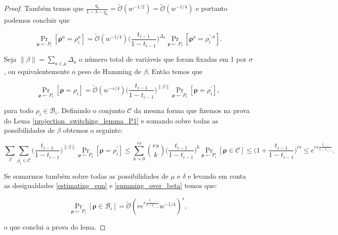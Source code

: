 \begin{proof}
	Também temos que $\frac{q_{a}}{1 - \lambda - q_{a}} = \widetilde{\mathcal{O}}(w^{-1/2}) = \widetilde{\mathcal{O}}(w^{-1/4})$ e portanto podemos concluir que
	
	\begin{equation*}
		\Pr_{\boldsymbol{\rho} \leftarrow P_{i}}[\boldsymbol{\rho}^{a} = \rho_{i}^{a}] = \widetilde{\mathcal{O}}(w^{-1/4}) \bigg( \frac{t_{i - 1}}{1 - t_{i - 1}} \bigg)^{\Delta_{a}}\Pr_{\boldsymbol{\rho} \leftarrow P_{i}}[\boldsymbol{\rho}^{a} = \rho_{i}^{\prime, a}].
	\end{equation*}
	
	Seja $\lVert \beta \rVert = \sum_{a \in \mu} \Delta_{a}$ o número total de variáveis que foram fixadas em 1 por $\sigma$, ou equivalentemente o peso de Hamming de $\beta$. Então temos que
	
	\begin{equation} \label{estimating_eqn}
		\Pr_{\boldsymbol{\rho} \leftarrow P_{i}}[\boldsymbol{\rho} = \rho_{i}] = \widetilde{\mathcal{O}}(w^{-s/4}) \bigg( \frac{t_{i - 1}}{1 - t_{i - 1}} \bigg)^{\lVert \beta \rVert}\Pr_{\boldsymbol{\rho} \leftarrow P_{i}}[\boldsymbol{\rho} = \rho_{i}^{\prime}],
	\end{equation}
	
	para todo $\rho_{i} \in \mathcal{B}_{i}$. Definindo o conjunto $\mathcal{C}$ da mesma forma que fizemos na prova do Lema \ref{projection_switching_lemma_P1} e somando sobre todas as possibilidades de $\beta$ obtemos o seguinte: 
	
	\begin{equation} \label{summing_over_beta}
		\sum_{\beta}\sum_{\rho_{i}^{\prime} \in \mathcal{C}} \bigg( \frac{t_{i - 1}}{1 - t_{i - 1}} \bigg)^{\lVert \beta \rVert} \Pr_{\boldsymbol{\rho} \leftarrow P_{i}}[\boldsymbol{\rho} = \rho_{i}^{\prime}] \leq \sum_{k = 0}^{rs} \binom{rs}{k} \bigg( \frac{t_{i - 1}}{1 - t_{i - 1}} \bigg)^{k} \Pr_{\boldsymbol{\rho} \leftarrow P_{i}}[\boldsymbol{\rho} \in \mathcal{C}] \leq \bigg( 1 + \frac{t_{i - 1}}{1 - t_{i - 1}}\bigg)^{rs} \leq e^{rs\frac{t_{i - 1}}{1 - t_{i - 1}}}.
	\end{equation}
	
	Se somarmos também sobre todas as possibilidades de $\mu$ e $\delta$ e levando em conta as desigualdades \ref{estimating_eqn} e \ref{summing_over_beta} temos que:
	
	\begin{equation*}
		\Pr_{\boldsymbol{\rho} \leftarrow P_{i}}[\boldsymbol{\rho} \in \mathcal{B}_{i}] = \widetilde{\mathcal{O}}(re^{r\frac{t_{i - 1}}{1 - t_{i - 1}}}w^{-1/4})^{s},
	\end{equation*}

	o que conclui a prova do lema.

\end{proof}

